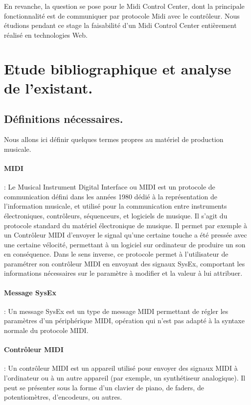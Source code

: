 \documentclass[francais]{rapportPFE}  %
\begin{document}
En revanche, la question se pose pour le Midi Control Center, dont la principale fonctionnalité est de communiquer par protocole Midi avec le contrôleur. Nous étudions pendant ce stage la faisabilité d'un Midi Control Center entièrement réalisé en technologies Web.

\section{Etude bibliographique et analyse de l'existant.}


\subsection{Définitions nécessaires.}

Nous allons ici définir quelques termes propres au matériel de production musicale.
\paragraph{MIDI} \cite{midi}
: Le Musical Instrument Digital Interface ou MIDI est un protocole de communication défini dans les années 1980 dédié à la représentation de l'information musicale, et utilisé pour la communication entre instruments électroniques, contrôleurs, séquenceurs, et logiciels de musique. Il s'agit du protocole standard du matériel électronique de musique. Il permet par exemple à un Contrôleur MIDI d'envoyer le signal qu'une certaine touche a été pressée avec une certaine vélocité, permettant à un logiciel sur ordinateur de produire un son en conséquence. Dans le sens inverse, ce protocole permet à l'utilisateur de paramétrer son contrôleur MIDI en envoyant des signaux SysEx, comportant les informations nécessaires sur le paramètre à modifier et la valeur à lui attribuer.
\paragraph{Message SysEx} \cite{sysex}
: Un message SysEx est un type de message MIDI permettant de régler les paramètres d'un périphérique MIDI, opération qui n'est pas adapté à la syntaxe normale du protocole MIDI. 
\paragraph{Contrôleur MIDI}  \cite{controller}
:  Un contrôleur MIDI est un appareil utilisé pour envoyer des signaux MIDI à l'ordinateur ou à un autre appareil (par exemple, un synthétiseur analogique). Il peut se présenter sous la forme d'un clavier de piano, de faders, de potentiomètres, d'encodeurs, ou autres.
\end{document}
